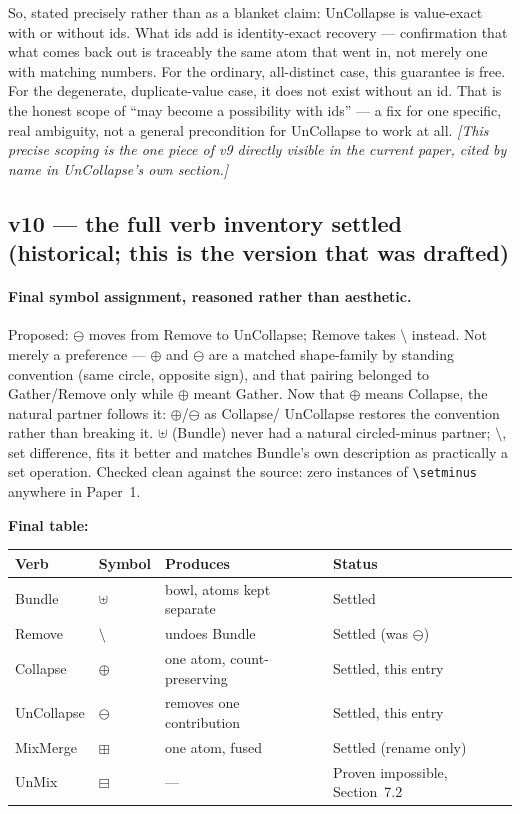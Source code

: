 \documentclass[11pt]{article}
\begin{document}
So, stated precisely rather than as a blanket claim: UnCollapse is
value-exact with or without ids. What ids add is identity-exact
recovery --- confirmation that what comes back out is traceably the
same atom that went in, not merely one with matching numbers. For the
ordinary, all-distinct case, this guarantee is free. For the
degenerate, duplicate-value case, it does not exist without an id.
That is the honest scope of ``may become a possibility with ids'' ---
a fix for one specific, real ambiguity, not a general precondition for
UnCollapse to work at all. \emph{[This precise scoping is the one
piece of v9 directly visible in the current paper, cited by name in
UnCollapse's own section.]}

\subsection*{v10 --- the full verb inventory settled (historical;
this is the version that was drafted)}

\paragraph{Final symbol assignment, reasoned rather than aesthetic.}
Proposed: $\ominus$ moves from Remove to UnCollapse; Remove takes
$\setminus$ instead. Not merely a preference --- $\oplus$ and
$\ominus$ are a matched shape-family by standing convention (same
circle, opposite sign), and that pairing belonged to Gather/Remove
only while $\oplus$ meant Gather. Now that $\oplus$ means Collapse,
the natural partner follows it: $\oplus$/$\ominus$ as Collapse/
UnCollapse restores the convention rather than breaking it. $\uplus$
(Bundle) never had a natural circled-minus partner; $\setminus$, set
difference, fits it better and matches Bundle's own description as
practically a set operation. Checked clean against the source: zero
instances of \texttt{\textbackslash setminus} anywhere in Paper~1.

\textbf{Final table:}
\begin{center}
\begin{tabular}{llll}
Verb & Symbol & Produces & Status \\
\hline
Bundle & $\uplus$ & bowl, atoms kept separate & Settled \\
Remove & $\setminus$ & undoes Bundle & Settled (was $\ominus$) \\
Collapse & $\oplus$ & one atom, count-preserving & Settled, this entry \\
UnCollapse & $\ominus$ & removes one contribution & Settled, this entry \\
MixMerge & $\boxplus$ & one atom, fused & Settled (rename only) \\
UnMix & $\boxminus$ & --- & Proven impossible, Section~7.2 \\
\end{tabular}
\end{center}
\end{document}
